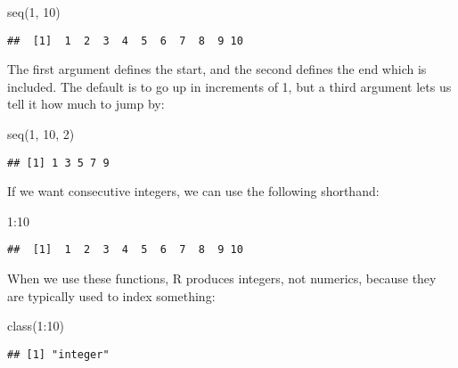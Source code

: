 \documentclass[
]{article}
\newenvironment{Shaded}{\begin{snugshade}}{\end{snugshade}}
\newcommand{\DecValTok}[1]{\textcolor[rgb]{0.00,0.00,0.81}{#1}}
\newcommand{\FunctionTok}[1]{\textcolor[rgb]{0.00,0.00,0.00}{#1}}
\newcommand{\NormalTok}[1]{#1}
\newcommand{\SpecialCharTok}[1]{\textcolor[rgb]{0.00,0.00,0.00}{#1}}
\begin{document}
\begin{Shaded}
\begin{Highlighting}[]
\FunctionTok{seq}\NormalTok{(}\DecValTok{1}\NormalTok{, }\DecValTok{10}\NormalTok{)}
\end{Highlighting}
\end{Shaded}

\begin{verbatim}
##  [1]  1  2  3  4  5  6  7  8  9 10
\end{verbatim}

The first argument defines the start, and the second defines the end
which is included. The default is to go up in increments of 1, but a
third argument lets us tell it how much to jump by:

\begin{Shaded}
\begin{Highlighting}[]
\FunctionTok{seq}\NormalTok{(}\DecValTok{1}\NormalTok{, }\DecValTok{10}\NormalTok{, }\DecValTok{2}\NormalTok{)}
\end{Highlighting}
\end{Shaded}

\begin{verbatim}
## [1] 1 3 5 7 9
\end{verbatim}

If we want consecutive integers, we can use the following shorthand:

\begin{Shaded}
\begin{Highlighting}[]
\DecValTok{1}\SpecialCharTok{:}\DecValTok{10}
\end{Highlighting}
\end{Shaded}

\begin{verbatim}
##  [1]  1  2  3  4  5  6  7  8  9 10
\end{verbatim}

When we use these functions, R produces integers, not numerics, because
they are typically used to index something:

\begin{Shaded}
\begin{Highlighting}[]
\FunctionTok{class}\NormalTok{(}\DecValTok{1}\SpecialCharTok{:}\DecValTok{10}\NormalTok{)}
\end{Highlighting}
\end{Shaded}

\begin{verbatim}
## [1] "integer"
\end{verbatim}
\end{document}
